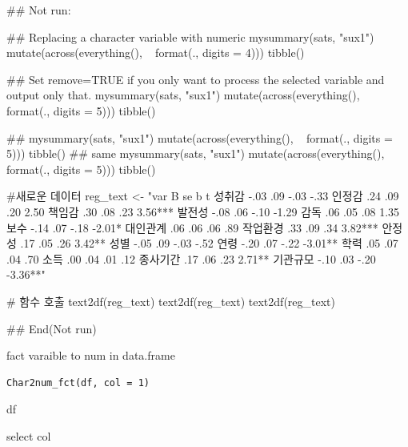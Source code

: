 \documentclass[a4paper]{book}
\begin{document}
\begin{Examples}
\begin{ExampleCode}

## Not run: 

## Replacing a character variable with numeric
mysummary(sats, "sux1") %
    mutate(across(everything(), ~ format(., digits = 4))) %
    tibble() %


## Set remove=TRUE if you only want to process the selected variable and output only that.
  mysummary(sats, "sux1") %
  mutate(across(everything(), ~ format(., digits = 5))) %
    tibble() %

##
mysummary(sats, "sux1") %
  mutate(across(everything(), ~ format(., digits = 5))) %
    tibble() %
## same
  mysummary(sats, "sux1") %
     mutate(across(everything(), ~ format(., digits = 5))) %
     tibble() %


#새로운 데이터
reg_text <- "var B se b t
성취감 -.03 .09 -.03 -.33
인정감 .24 .09 .20 2.50
책임감 .30 .08 .23 3.56***
발전성 -.08 .06 -.10 -1.29
감독 .06 .05 .08 1.35
보수 -.14 .07 -.18 -2.01*
대인관계 .06 .06 .06 .89
작업환경 .33 .09 .34 3.82***
안정성 .17 .05 .26 3.42**
성별 -.05 .09 -.03 -.52
연령 -.20 .07 -.22 -3.01**
학력 .05 .07 .04 .70
소득 .00 .04 .01 .12
종사기간 .17 .06 .23 2.71**
기관규모 -.10 .03 -.20 -3.36**"

# 함수 호출
text2df(reg_text) %
text2df(reg_text)%
text2df(reg_text)%

## End(Not run)

\end{ExampleCode}
\end{Examples}
%
\begin{Description}
fact varaible to num  in data.frame
\end{Description}
%
\begin{Usage}
\begin{verbatim}
Char2num_fct(df, col = 1)
\end{verbatim}
\end{Usage}
%
\begin{Arguments}
\begin{ldescription}
\item[\code{df}] df

\item[\code{col}] select col
\end{ldescription}
\end{Arguments}
\end{document}
